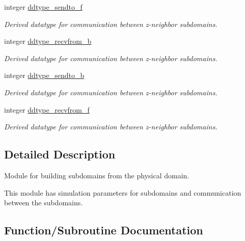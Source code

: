 \textbf{ }\par
\begin{DoxyCompactItemize}
\item 
integer \mbox{\hyperlink{namespacempi__subdomain_a4f3d66535b947c7afee75e6e73a47206}{ddtype\+\_\+sendto\+\_\+f}}
\begin{DoxyCompactList}\small\item\em Derived datatype for communication between z-\/neighbor subdomains. \end{DoxyCompactList}\item 
integer \mbox{\hyperlink{namespacempi__subdomain_ad6462f18c8c68c076005957e9d062252}{ddtype\+\_\+recvfrom\+\_\+b}}
\begin{DoxyCompactList}\small\item\em Derived datatype for communication between z-\/neighbor subdomains. \end{DoxyCompactList}\item 
integer \mbox{\hyperlink{namespacempi__subdomain_a7a2af0322a7aaa435951a5432859687a}{ddtype\+\_\+sendto\+\_\+b}}
\begin{DoxyCompactList}\small\item\em Derived datatype for communication between z-\/neighbor subdomains. \end{DoxyCompactList}\item 
integer \mbox{\hyperlink{namespacempi__subdomain_a4da19838e8bc3934ad5c24db424bec2c}{ddtype\+\_\+recvfrom\+\_\+f}}
\begin{DoxyCompactList}\small\item\em Derived datatype for communication between z-\/neighbor subdomains. \end{DoxyCompactList}\end{DoxyCompactItemize}



\subsection{Detailed Description}
Module for building subdomains from the physical domain. 

This module has simulation parameters for subdomains and communication between the subdomains. 

\subsection{Function/\+Subroutine Documentation}
\mbox{\label{namespacempi__subdomain_a55659431068678c08d21847338390ea8}} 
